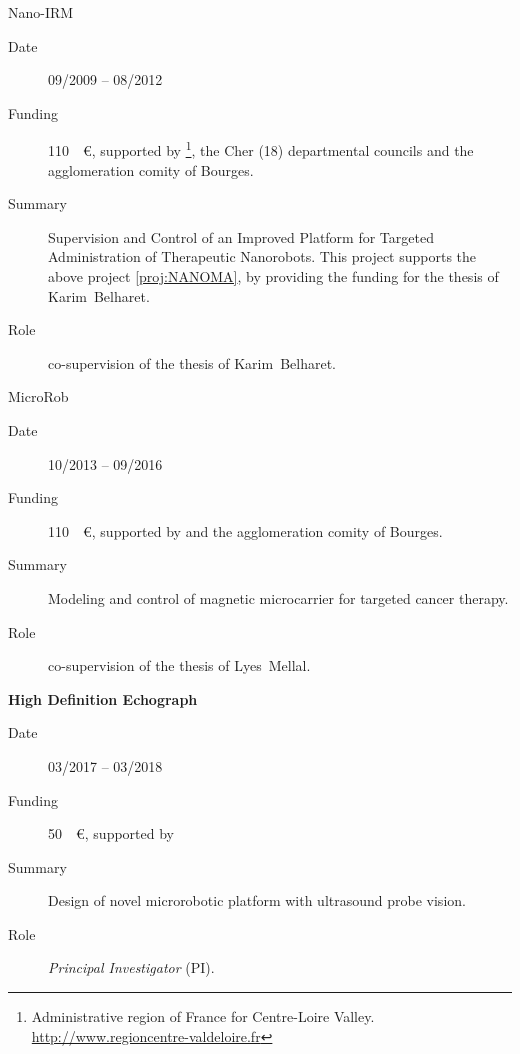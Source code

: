 \begin{enumerate}[leftmargin=3em,format={\sffamily\bfseries\smaller\color{blue2}},label={[LP\arabic*]}]
  \item{}\textsf{Nano-IRM}
  \begin{description}
    \item[Date] 09/2009 -- 08/2012
    \item[Funding] \SI{110}{\kilo\euro}, supported by \footnote{Administrative region of France for Centre-Loire Valley. \url{http://www.regioncentre-valdeloire.fr}}, the Cher (18) departmental councils and the agglomeration comity of Bourges.
    \item[Summary] Supervision and Control of an Improved \MRI Platform for Targeted Administration of Therapeutic Nanorobots.
    This project supports the above  project \ref{proj:NANOMA}, by providing the funding for the \PhD thesis of Karim~Belharet.
    \item[Role] co-supervision of the \PhD thesis of Karim~Belharet.
  \end{description}

  \medskip
  \item{}\textsf{MicroRob}
  \begin{description}
  \item[Date] 10/2013 -- 09/2016
  \item[Funding] \SI{110}{\kilo\euro}, supported by  and the agglomeration comity of Bourges.
  \item[Summary] Modeling and control of magnetic microcarrier for targeted cancer therapy.
  \item[Role] co-supervision of the \PhD thesis of Lyes~Mellal.
  \end{description}
  \medskip
  
  \item{}\textsf{\bfseries High Definition Echograph}
  \begin{description}
    \item[Date] 03/2017 -- 03/2018
    \item[Funding] \SI{50}{\kilo\euro}, supported by  
    \item[Summary] Design of novel microrobotic platform with ultrasound probe vision.
    \item[Role] \textsl{Principal Investigator} (PI).
  \end{description}

\end{enumerate}

